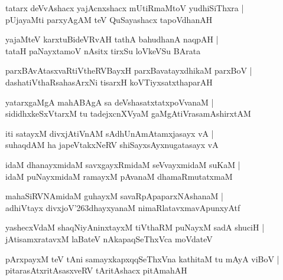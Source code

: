 \documentclass[twoside,12pt,openright]{book}
\def\S{\char'263}
\newcounter{shloka}[chapter]
\begin{document}
\begin{shloka}
tatarx deVvAshacx yajAcnxshacx mUtiRmaMtoV yudhiSiThxra |\\
pUjayaMti parxyAgAM teV QuSayashacx tapoVdhanAH 
\end{shloka}

\begin{shloka}
yajaMteV karxtuBideVRvAH tathA bahudhanA naqpAH |\\
tataH paNayxtamoV nAsitx tirxSu loVkeVSu BArata 
\end{shloka}

\begin{shloka}
parxBAvAtasxvaRtiVtheRVBayxH parxBavatayxdhikaM parxBoV |\\
dashatiVthaRsahasArxNi tisarxH koVTiyxsatxthaparAH
\end{shloka}

\begin{shloka}
yatarxgaMgA mahABAgA sa deVshasatxtatxpoVvanaM |\\
sididhxkeSxVtarxM tu tadejxcnXVyaM gaMgAtiVrasamAshirxtAM 
\end{shloka}

\begin{shloka}
iti satayxM divxjAtiVnAM sAdhUnAmAtamxjasayx vA |\\
suhaqdAM ha japeVtakxNeRV shiSayxsAyxnugatasayx vA 
\end{shloka}

\begin{shloka}
idaM dhanayxmidaM savxgayxRmidaM seVvayxmidaM suKaM |\\
idaM puNayxmidaM ramayxM pAvanaM dhamaRmutatxmaM 
\end{shloka}

\begin{shloka}
mahaSiRVNAmidaM guhayxM savaRpApaparxNAshanaM |\\
adhiVtayx divxjoV\S dhayxyanaM nimaRlatavxmavApunxyAtf 
\end{shloka}

\begin{shloka}
yashecxVdaM shaqNiyAninxtayxM tiVthaRM puNayxM sadA shuciH |\\
jAtisamxratavxM laBateV nAkapaqSeThxVca moVdateV 
\end{shloka}

\begin{shloka}
pArxpayxM teV tAni samayxkapxqqSeThxVna kathitaM tu mAyA viBoV |\\
pitarasAtxritAsasxveRV tAritAshacx pitAmahAH 
\end{shloka}
\end{document}
